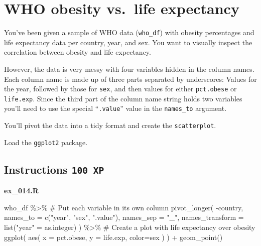 \documentclass[
  letterpaper,
  DIV=11,
  numbers=noendperiod]{scrreprt}
\newenvironment{Shaded}{\begin{snugshade}}{\end{snugshade}}
\newcommand{\AttributeTok}[1]{\textcolor[rgb]{0.40,0.45,0.13}{#1}}
\newcommand{\CommentTok}[1]{\textcolor[rgb]{0.37,0.37,0.37}{#1}}
\newcommand{\FunctionTok}[1]{\textcolor[rgb]{0.28,0.35,0.67}{#1}}
\newcommand{\NormalTok}[1]{\textcolor[rgb]{0.00,0.23,0.31}{#1}}
\newcommand{\OtherTok}[1]{\textcolor[rgb]{0.00,0.23,0.31}{#1}}
\newcommand{\SpecialCharTok}[1]{\textcolor[rgb]{0.37,0.37,0.37}{#1}}
\newcommand{\StringTok}[1]{\textcolor[rgb]{0.13,0.47,0.30}{#1}}
\begin{document}
\hypertarget{who-obesity-vs.-life-expectancy}{%
\section{WHO obesity vs.~life
expectancy}\label{who-obesity-vs.-life-expectancy}}

You've been given a sample of WHO data (\texttt{who\_df}) with obesity
percentages and life expectancy data per country, year, and sex. You
want to visually inspect the correlation between obesity and life
expectancy.

However, the data is very messy with four variables hidden in the column
names. Each column name is made up of three parts separated by
underscores: Values for the year, followed by those for \texttt{sex},
and then values for either \texttt{pct.obese} or \texttt{life.exp}.
Since the third part of the column name string holds two variables
you'll need to use the special ``\texttt{.value}'' value in the
\texttt{names\_to} argument.

You'll pivot the data into a tidy format and create the
\texttt{scatterplot}.

Load the \texttt{ggplot2} package.

\hypertarget{instructions-100-xp-11}{%
\subsection*{\texorpdfstring{Instructions
\texttt{100\ XP}}{Instructions 100 XP}}\label{instructions-100-xp-11}}

\textbf{ex\_014.R}

\begin{Shaded}
\begin{Highlighting}[]
\NormalTok{who\_df }\SpecialCharTok{\%\textgreater{}\%} 
  \CommentTok{\# Put each variable in its own column}
  \FunctionTok{pivot\_longer}\NormalTok{(}
    \SpecialCharTok{{-}}\NormalTok{country,}
    \AttributeTok{names\_to =} \FunctionTok{c}\NormalTok{(}\StringTok{"year"}\NormalTok{, }\StringTok{"sex"}\NormalTok{, }\StringTok{".value"}\NormalTok{),}
    \AttributeTok{names\_sep =} \StringTok{"\_"}\NormalTok{, }
    \AttributeTok{names\_transform =} \FunctionTok{list}\NormalTok{(}\StringTok{"year"} \OtherTok{=}\NormalTok{ as.integer)}
\NormalTok{  ) }\SpecialCharTok{\%\textgreater{}\%}
  \CommentTok{\# Create a plot with life expectancy over obesity}
  \FunctionTok{ggplot}\NormalTok{(}
    \FunctionTok{aes}\NormalTok{(}
      \AttributeTok{x =}\NormalTok{ pct.obese,}
      \AttributeTok{y =}\NormalTok{ life.exp,}
      \AttributeTok{color=}\NormalTok{sex}
\NormalTok{    )}
\NormalTok{  ) }\SpecialCharTok{+}
  \FunctionTok{geom\_point}\NormalTok{()}
\end{Highlighting}
\end{Shaded}
\end{document}
